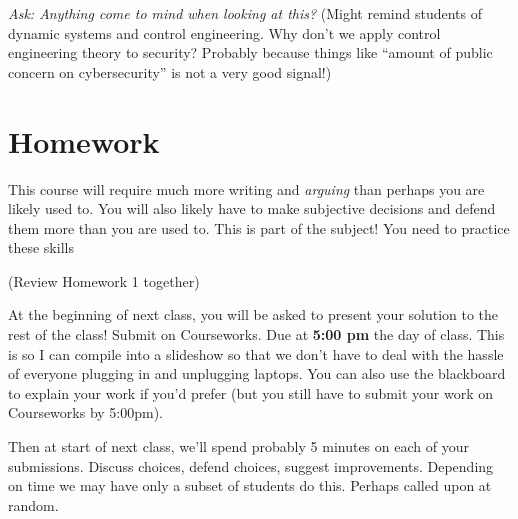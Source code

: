 \documentclass[11pt]{article}
\begin{document}
{\it Ask: Anything come to mind when looking at this?} (Might remind students of dynamic systems and control engineering. Why don't we apply control engineering theory to security? Probably because things like ``amount of public concern on cybersecurity'' is not a very good signal!)

\section{Homework}

This course will require much more writing and {\it arguing} than perhaps you are likely used to.
You will also likely have to make subjective decisions and defend them more than you are used to. This is part of the subject! You need to practice these skills

(Review Homework 1 together)

At the beginning of next class, you will be asked to present your solution to the rest of the class! Submit on Courseworks. Due at {\bf 5:00 pm} the day of class. This is so I can compile into a slideshow so that we don't have to deal with the hassle of everyone plugging in and unplugging laptops. You can also use the blackboard to explain your work if you'd prefer (but you still have to submit your work on Courseworks by 5:00pm).

Then at start of next class, we'll spend probably 5 minutes on each of your submissions. Discuss choices, defend choices, suggest improvements. Depending on time we may have only a subset of students do this. Perhaps called upon at random. 
\end{document}
